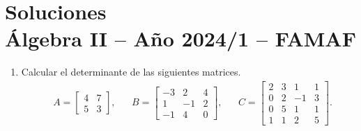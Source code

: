 
\chapter{Soluciones\\Álgebra  II -- Año 2024/1 -- FAMAF}\label{practico-4}

\begin{enumerate}[topsep=6pt,itemsep=.4cm]
    \item Calcular el determinante de las siguientes matrices.
        \begin{align*}
        &A=\begin{bmatrix} 4&7\\ 5&3\end{bmatrix},
        &&B=\begin{bmatrix} -3&2&4\\ 1&-1&2\\ -1&4&0\end{bmatrix},
        &&
        C=\begin{bmatrix} 2&3&1&1\\ 0&2&-1&3 \\ 0&5&1&1 \\1&1&2&5\end{bmatrix}.
        \end{align*}
        

\end{enumerate}
